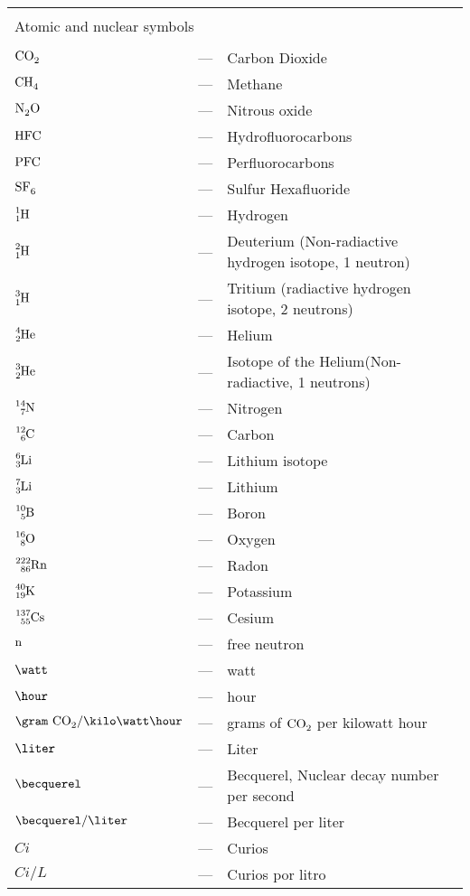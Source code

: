 \begin{longtable}{p{25mm} c p{120mm} }
\\
\\
\multicolumn{3}{l}{Atomic and nuclear symbols}\\
\\
$\ce{CO_2}$ & --- & Carbon Dioxide\\
$\ce{CH_4}$ & --- & Methane\\
$\ce{N_2 O}$ & --- & Nitrous oxide\\
$\ce{HFC}$ & --- & Hydrofluorocarbons\\
$\ce{PFC}$ & --- & Perfluorocarbons\\
$\ce{SF_6}$ & --- & Sulfur Hexafluoride\\
$\ce{^{1}_{1}H}$ & --- & Hydrogen\\
$\ce{^{2}_{1}H}$ & --- & Deuterium (Non-radiactive hydrogen isotope, 1 neutron)\\
$\ce{^{3}_{1}H}$ & --- & Tritium (radiactive hydrogen isotope, 2 neutrons)\\
$\ce{^{4}_{2}He}$ & --- & Helium\\
$\ce{^{3}_{2}He}$ & --- & Isotope of the Helium(Non-radiactive, 1 neutrons)\\
$\ce{^{14}_{7}N}$ & --- & Nitrogen\\
$\ce{^{12}_{6}C}$ & --- & Carbon\\
$\ce{^{6}_{3}Li}$ & --- & Lithium isotope\\
$\ce{^{7}_{3}Li}$ & --- & Lithium\\
$\ce{^{10}_{5}B}$ & --- & Boron\\
$\ce{^{16}_{8}O}$ & --- & Oxygen\\
$\ce{^{222}_{86}Rn}$ & --- & Radon\\
$\ce{^{40}_{19}K}$ & --- & Potassium\\
$\ce{^{137}_{55}Cs}$ & --- & Cesium\\
$\ce{n}$ & --- & free neutron\\
$\watt$ & --- & watt\\
$\hour$ & --- & hour\\
$\gram~\ce{CO_2} /\kilo\watt\hour$ & --- & grams of $\ce{CO_2}$ per kilowatt hour\\
$\liter$ & --- & Liter\\
$\becquerel$ & --- & Becquerel, Nuclear decay number per second\\
$\becquerel/\liter$ & --- & Becquerel per liter\\
$Ci$ & --- & Curios\\
$Ci/L$ & --- & Curios por litro\\

\end{longtable}
